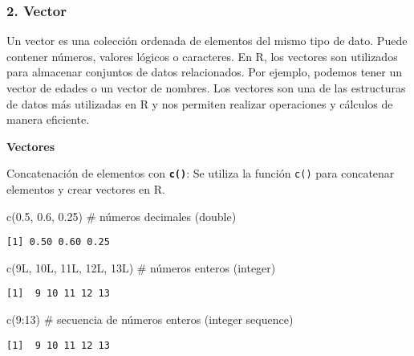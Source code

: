 \documentclass[
  a4paper,
]{article}
\newenvironment{Shaded}{}{}
\newcommand{\CommentTok}[1]{\textcolor[rgb]{0.42,0.45,0.49}{#1}}
\newcommand{\DecValTok}[1]{\textcolor[rgb]{0.00,0.36,0.77}{#1}}
\newcommand{\FloatTok}[1]{\textcolor[rgb]{0.00,0.36,0.77}{#1}}
\newcommand{\FunctionTok}[1]{\textcolor[rgb]{0.44,0.26,0.76}{#1}}
\newcommand{\NormalTok}[1]{\textcolor[rgb]{0.14,0.16,0.18}{#1}}
\newcommand{\SpecialCharTok}[1]{\textcolor[rgb]{0.00,0.36,0.77}{#1}}
\begin{document}
\hypertarget{vector}{%
\subsubsection{2. Vector}\label{vector}}

Un vector es una colección ordenada de elementos del mismo tipo de dato.
Puede contener números, valores lógicos o caracteres. En R, los vectores
son utilizados para almacenar conjuntos de datos relacionados. Por
ejemplo, podemos tener un vector de edades o un vector de nombres. Los
vectores son una de las estructuras de datos más utilizadas en R y nos
permiten realizar operaciones y cálculos de manera eficiente.

\textbf{Vectores}

Concatenación de elementos con \textbf{\texttt{c()}}: Se utiliza la
función \texttt{c()} para concatenar elementos y crear vectores en R.

\begin{Shaded}
\begin{Highlighting}[]
\FunctionTok{c}\NormalTok{(}\FloatTok{0.5}\NormalTok{, }\FloatTok{0.6}\NormalTok{, }\FloatTok{0.25}\NormalTok{) }\CommentTok{\# números decimales (double)}
\end{Highlighting}
\end{Shaded}

\begin{verbatim}
[1] 0.50 0.60 0.25
\end{verbatim}

\begin{Shaded}
\begin{Highlighting}[]
\FunctionTok{c}\NormalTok{(9L, 10L, 11L, 12L, 13L) }\CommentTok{\# números enteros (integer)}
\end{Highlighting}
\end{Shaded}

\begin{verbatim}
[1]  9 10 11 12 13
\end{verbatim}

\begin{Shaded}
\begin{Highlighting}[]
\FunctionTok{c}\NormalTok{(}\DecValTok{9}\SpecialCharTok{:}\DecValTok{13}\NormalTok{) }\CommentTok{\# secuencia de números enteros (integer sequence)}
\end{Highlighting}
\end{Shaded}

\begin{verbatim}
[1]  9 10 11 12 13
\end{verbatim}
\end{document}
